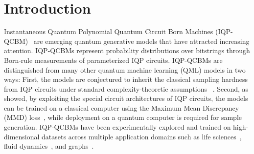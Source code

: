 \documentclass{article}
\theoremstyle{plain}
\theoremstyle{definition}
\theoremstyle{remark}
\newcommand{\ks}[1]{\textcolor{orange}{Kevin: #1}}
\begin{document}
\section{Introduction}
Instantaneous Quantum Polynomial Quantum Circuit Born Machines (IQP-QCBM)~\citep{shepherd09,Liu18} are emerging quantum generative models that have attracted increasing attention. IQP-QCBMs represent probability distributions over bitstrings through Born-rule measurements of parameterized IQP circuits. IQP-QCBMs are distinguished from many other quantum machine learning (QML) models in two ways: First, the models are conjectured to inherit the classical sampling hardness from IQP circuits under standard complexity-theoretic assumptions ~\citep{Bremner10,Bremner16}. Second, as \citet{recioarmengol25} showed, by exploiting the special circuit architectures of IQP circuits, the models can be trained on a classical computer using the Maximum Mean Discrepancy (MMD) loss~\citep{gretton12}, while deployment on a quantum computer is required for sample generation. IQP-QCBMs have been experimentally explored and trained on high-dimensional datasets across multiple application domains such as life sciences~\citep{11250278}, fluid dynamics~\citep{liu2026generativequantumutilitycorrelationcomplexity}, and graphs~\citep{jcdk-q3xc}. 
\end{document}
